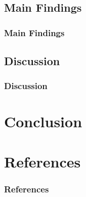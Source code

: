 \documentclass[11pt, aspectratio=1610, xcolor={dvipsnames}]{beamer}
\begin{document}
	\subsection{Main Findings}
	\begin{frame}
		\frametitle{Main Findings}
	\end{frame}
	
	\subsection{Discussion}
	\begin{frame}
		\frametitle{Discussion}
	\end{frame}
	
	\section{Conclusion}
	\begin{frame}
		\frametitle{}
	\end{frame}
	
	\section*{References}
	\begin{frame}
		\frametitle{References}
		
		
		
	\end{frame}
	
\end{document}
